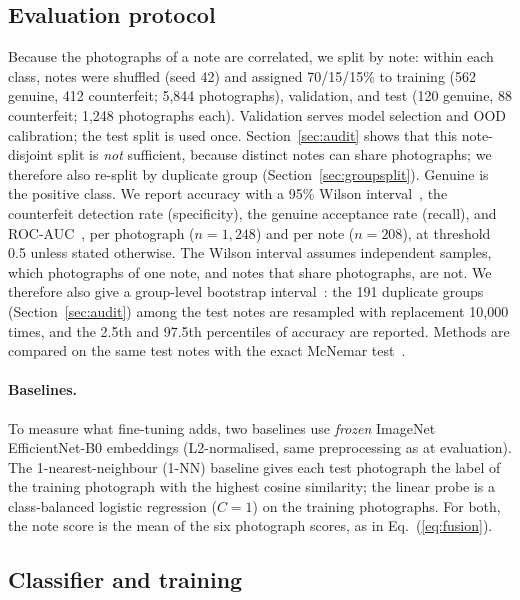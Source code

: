 \documentclass[pdflatex,iicol,sn-mathphys-num]{sn-jnl}
\begin{document}
\subsection{Evaluation protocol}\label{sec:protocol}

Because the photographs of a note are correlated, we split by note: within each class,
notes were shuffled (seed 42) and assigned 70/15/15\% to training (562 genuine, 412
counterfeit; 5{,}844 photographs), validation, and test (120 genuine, 88 counterfeit;
1{,}248 photographs each). Validation serves model selection and OOD calibration; the
test split is used once. Section~\ref{sec:audit} shows that this note-disjoint split is
\emph{not} sufficient, because distinct notes can share photographs; we therefore also
re-split by duplicate group (Section~\ref{sec:groupsplit}). Genuine is the
positive class. We report accuracy with a 95\% Wilson
interval~\cite{wilson1927probable}, the counterfeit detection rate (specificity), the
genuine acceptance rate (recall), and ROC-AUC~\cite{fawcett2006roc}, per photograph
($n=1{,}248$) and per note ($n=208$), at threshold 0.5 unless stated otherwise.
The Wilson interval assumes independent samples, which photographs of one note, and
notes that share photographs, are not. We therefore also give a group-level bootstrap
interval~\cite{efron1993bootstrap}: the 191 duplicate groups (Section~\ref{sec:audit})
among the test notes are resampled with replacement 10{,}000 times, and the 2.5th and
97.5th percentiles of accuracy are reported. Methods are compared on the same test notes
with the exact McNemar test~\cite{mcnemar1947,dietterich1998tests}.

\paragraph{Baselines.} To measure what fine-tuning adds, two baselines use \emph{frozen}
ImageNet EfficientNet-B0 embeddings (L2-normalised, same preprocessing as at
evaluation). The 1-nearest-neighbour (1-NN) baseline gives each test photograph the
label of the training photograph with the highest cosine similarity; the linear probe is
a class-balanced logistic regression ($C=1$) on the training photographs. For both, the
note score is the mean of the six photograph scores, as in Eq.~(\ref{eq:fusion}).

\subsection{Classifier and training}\label{sec:training}
\end{document}
